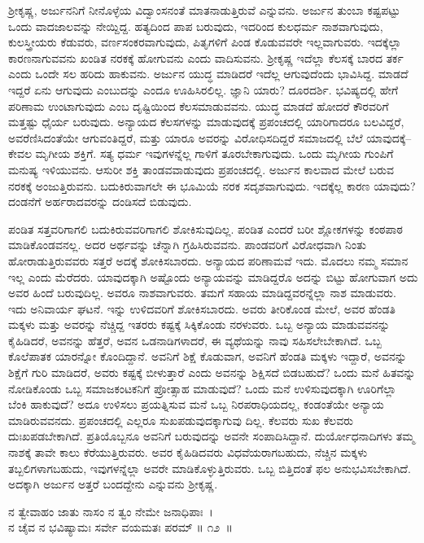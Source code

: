 ಶ‍್ರೀಕೃಷ್ಣ, ಅರ್ಜುನನಿಗೆ ನೀನೊಳ್ಳೆಯ ವಿದ್ವಾಂಸನಂತೆ ಮಾತನಾಡುತ್ತಿರುವೆ ಎನ್ನುವನು. ಅರ್ಜುನ ತುಂಬಾ ಕಷ್ಟಪಟ್ಟು ಒಂದು ವಾದಜಾಲವನ್ನು ನೇಯ್ದಿದ್ದ. ಹತ್ಯದಿಂದ ಪಾಪ ಬರುವುದು, ಇದರಿಂದ ಕುಲಧರ್ಮ ನಾಶವಾಗುವುದು, ಕುಲಸ್ತ್ರೀಯರು ಕೆಡುವರು, ವರ್ಣಸಂಕರವಾಗುವುದು, ಪಿತೃಗಳಿಗೆ ಪಿಂಡ ಕೊಡುವವರೇ ಇಲ್ಲವಾಗುವರು. ಇದಕ್ಕೆಲ್ಲಾ ಕಾರಣನಾಗುವವನು ಖಂಡಿತ ನರಕಕ್ಕೆ ಹೋಗುವನು ಎಂದು ವಾದಿಸುವನು. ಶ‍್ರೀಕೃಷ್ಣ ಇದೆಲ್ಲಾ ಕೆಲಸಕ್ಕೆ ಬಾರದ ತರ್ಕ ಎಂದು ಒಂದೇ ಸಲ ಹರಿದು ಹಾಕುವನು. ಅರ್ಜುನ ಯುದ್ಧ ಮಾಡಿದರೆ ಇದೆಲ್ಲ ಆಗುವುದೆಂದು ಭಾವಿಸಿದ್ದ. ಮಾಡದೆ ಇದ್ದರೆ ಏನು ಆಗುವುದು ಎಂಬುದನ್ನು ಎಂದೂ ಊಹಿಸಿರಲಿಲ್ಲ. ಜ್ಞಾನಿ ಯಾರು? ದೂರದರ್ಶಿ. ಭವಿಷ್ಯದಲ್ಲಿ ಹೇಗೆ ಪರಿಣಾಮ ಉಂಟಾಗುವುದು ಎಂಬ ದೃಷ್ಟಿಯಿಂದ ಕೆಲಸಮಾಡುವವನು. ಯುದ್ಧ ಮಾಡದೆ ಹೋದರೆ ಕೌರವರಿಗೆ ಮತ್ತಷ್ಟು ಧೈರ್ಯ ಬರುವುದು. ಅನ್ಯಾಯದ ಕೆಲಸಗಳನ್ನು ಮಾಡುವುದಕ್ಕೆ ಪ್ರಪಂಚದಲ್ಲಿ ಯಾರಿಗಾದರೂ ಬಲವಿದ್ದರೆ, ಅವರೆಣಿಸಿದಂತೆಯೇ ಆಗುವಂತಿದ್ದರೆ, ಮತ್ತು ಯಾರೂ ಅವರನ್ನು ವಿರೋಧಿಸದಿದ್ದರೆ ಸಮಾಜದಲ್ಲಿ ಬೆಲೆ ಯಾವುದಕ್ಕೆ–ಕೇವಲ ಮೃಗೀಯ ಶಕ್ತಿಗೆ. ಸತ್ಯ ಧರ್ಮ ಇವುಗಳನ್ನೆಲ್ಲ ಗಾಳಿಗೆ ತೂರಬೇಕಾಗುವುದು. ಒಂದು ಮೃಗೀಯ ಗುಂಪಿಗೆ ಮನುಷ್ಯ ಇಳಿಯುವನು. ಆಸುರೀ ಶಕ್ತಿ ತಾಂಡವವಾಡುವುದು ಪ್ರಪಂಚದಲ್ಲಿ. ಅರ್ಜುನ ಕಾಲವಾದ ಮೇಲೆ ಬರುವ ನರಕಕ್ಕೆ ಅಂಜುತ್ತಿರುವನು. ಬದುಕಿರುವಾಗಲೇ ಈ ಭೂಮಿಯೆ ನರಕ ಸದೃಶವಾಗುವುದು. ಇದಕ್ಕೆಲ್ಲ ಕಾರಣ ಯಾವುದು? ದಂಡನೆಗೆ ಅರ್ಹರಾದವರನ್ನು ದಂಡಿಸದೆ ಬಿಡುವುದು.

ಪಂಡಿತ ಸತ್ತವರಿಗಾಗಲಿ ಬದುಕಿರುವವರಿಗಾಗಲಿ ಶೋಕಿಸುವುದಿಲ್ಲ. ಪಂಡಿತ ಎಂದರೆ ಬರೀ ಶ್ಲೋಕಗಳನ್ನು ಕಂಠಪಾಠ ಮಾಡಿಕೊಂಡವನಲ್ಲ. ಅದರ ಅರ್ಥವನ್ನು ಚೆನ್ನಾಗಿ ಗ್ರಹಿಸಿರುವವನು. ಪಾಂಡವರಿಗೆ ವಿರೋಧವಾಗಿ ನಿಂತು ಹೋರಾಡುತ್ತಿರುವವರು ಸತ್ತರೆ ಅದಕ್ಕೆ ಶೋಕಿಸಬಾರದು. ಅನ್ಯಾಯದ ಪರಿಣಾಮವೆ ಇದು. ಮೊದಲು ನಮ್ಮ ಸಮಾನ ಇಲ್ಲ ಎಂದು ಮೆರೆದರು. ಯಾವುದಕ್ಕಾಗಿ ಅಷ್ಟೊಂದು ಅನ್ಯಾಯವನ್ನು ಮಾಡಿದ್ದರೊ ಅದನ್ನು ಬಿಟ್ಟು ಹೋಗುವಾಗ ಅದು ಅವರ ಹಿಂದೆ ಬರುವುದಿಲ್ಲ. ಅವರೂ ನಾಶವಾಗುವರು. ತಮಗೆ ಸಹಾಯ ಮಾಡಿದ್ದವರನ್ನೆಲ್ಲಾ ನಾಶ ಮಾಡುವರು. ಇದು ಅನಿವಾರ್ಯ ಘಟನೆ. ಇನ್ನು ಉಳಿದವರಿಗೆ ಶೋಕಿಸಬಾರದು. ಅವರು ತೀರಿಕೊಂಡ ಮೇಲೆ, ಅವರ ಹೆಂಡತಿ ಮಕ್ಕಳು ಮತ್ತು ಅವರನ್ನು ನೆಚ್ಚಿದ್ದ ಇತರರು ಕಷ್ಟಕ್ಕೆ ಸಿಕ್ಕಿಕೊಂಡು ನರಳುವರು. ಒಬ್ಬ ಅನ್ಯಾಯ ಮಾಡುವವನನ್ನು ಕೈಹಿಡಿದರೆ, ಅವನನ್ನು ಹೆತ್ತರೆ, ಅವನ ಒಡನಾಡಿಗಳಾದರೆ, ಈ ವ್ಯಥೆಯನ್ನು ನಾವು ಸಹಿಸಲೇಬೇಕಾಗಿದೆ. ಒಬ್ಬ ಕೊಲೆಪಾತಕ ಯಾರನ್ನೋ ಕೊಂದಿದ್ದಾನೆ. ಅವನಿಗೆ ಶಿಕ್ಷೆ ಕೊಡುವಾಗ, ಅವನಿಗೆ ಹೆಂಡತಿ ಮಕ್ಕಳು ಇದ್ದಾರೆ, ಅವನನ್ನು ಶಿಕ್ಷೆಗೆ ಗುರಿ ಮಾಡಿದರೆ, ಅವರು ಕಷ್ಟಕ್ಕೆ ಬೀಳುತ್ತಾರೆ ಎಂದು ಅವನನ್ನು ಶಿಕ್ಷಿಸದೆ ಬಿಡಬಹುದೆ? ಒಂದು ಮನೆ ಹಿತವನ್ನು ನೋಡಿಕೊಂಡು ಒಬ್ಬ ಸಮಾಜಕಂಟಕನಿಗೆ ಪ್ರೋತ್ಸಾಹ ಮಾಡುವುದೆ? ಒಂದು ಮನೆ ಉಳಿಸುವುದಕ್ಕಾಗಿ ಊರಿಗೆಲ್ಲಾ ಬೆಂಕಿ ಹಾಕುವುದೆ? ಅದೂ ಉಳಿಸಲು ಪ್ರಯತ್ನಿಸುವ ಮನೆ ಒಬ್ಬ ನಿರಪರಾಧಿಯದಲ್ಲ, ಕಂಡಂತೆಯೇ ಅನ್ಯಾಯ ಮಾಡಿರುವವನದು. ಪ್ರಪಂಚದಲ್ಲಿ ಎಲ್ಲರೂ ಸುಖಪಡುವುದಕ್ಕಾಗುವು ದಿಲ್ಲ. ಕೆಲವರು ಸುಖ ಕೆಲವರು ದುಃಖಪಡಬೇಕಾಗಿದೆ. ಪ್ರತಿಯೊಬ್ಬನೂ ಅವನಿಗೆ ಬರುವುದನ್ನು ಅವನೇ ಸಂಪಾದಿಸಿದ್ದಾನೆ. ದುರ್ಯೋಧನಾದಿಗಳು ತಮ್ಮ ನಾಶಕ್ಕೆ ತಾವೇ ಕಾಲು ಕೆರೆಯುತ್ತಿರುವರು. ಅವರ ಕೈಹಿಡಿದವರು ವಿಧವೆಯರಾಗಬಹುದು, ನೆಚ್ಚಿನ ಮಕ್ಕಳು ತಬ್ಬಲಿಗಳಾಗಬಹುದು, ಇವುಗಳನ್ನೆಲ್ಲಾ ಅವರೇ ಮಾಡಿಕೊಳ್ಳುತ್ತಿರುವರು. ಒಬ್ಬ ಬಿತ್ತಿದಂತೆ ಫಲ ಅನುಭವಿಸಬೇಕಾಗಿದೆ. ಅದಕ್ಕಾಗಿ ಅರ್ಜುನ ಅತ್ತರೆ ಬಂದದ್ದೇನು ಎನ್ನುವನು ಶ‍್ರೀಕೃಷ್ಣ.

\begin{shloka}
ನ ತ್ವೇವಾಹಂ ಜಾತು ನಾಸಂ ನ ತ್ವಂ ನೇಮೇ ಜನಾಧಿಪಾಃ~।\\ನ ಚೈವ ನ ಭವಿಷ್ಯಾಮಃ ಸರ್ವೇ ವಯಮತಃ ಪರಮ್ \hfill॥ ೧೨~॥
\end{shloka}

